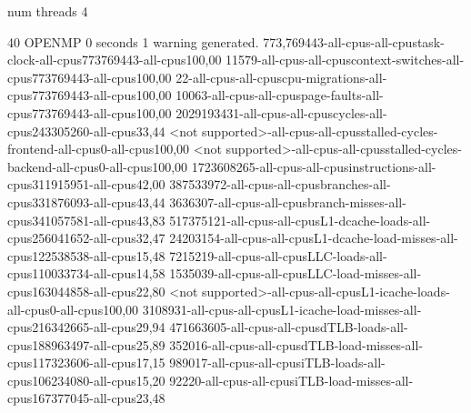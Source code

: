 num threads 4

40
OPENMP
0 seconds
1 warning generated.
773,769443-all-cpus-all-cpustask-clock-all-cpus773769443-all-cpus100,00
11579-all-cpus-all-cpuscontext-switches-all-cpus773769443-all-cpus100,00
22-all-cpus-all-cpuscpu-migrations-all-cpus773769443-all-cpus100,00
10063-all-cpus-all-cpuspage-faults-all-cpus773769443-all-cpus100,00
2029193431-all-cpus-all-cpuscycles-all-cpus243305260-all-cpus33,44
<not supported>-all-cpus-all-cpusstalled-cycles-frontend-all-cpus0-all-cpus100,00
<not supported>-all-cpus-all-cpusstalled-cycles-backend-all-cpus0-all-cpus100,00
1723608265-all-cpus-all-cpusinstructions-all-cpus311915951-all-cpus42,00
387533972-all-cpus-all-cpusbranches-all-cpus331876093-all-cpus43,44
3636307-all-cpus-all-cpusbranch-misses-all-cpus341057581-all-cpus43,83
517375121-all-cpus-all-cpusL1-dcache-loads-all-cpus256041652-all-cpus32,47
24203154-all-cpus-all-cpusL1-dcache-load-misses-all-cpus122538538-all-cpus15,48
7215219-all-cpus-all-cpusLLC-loads-all-cpus110033734-all-cpus14,58
1535039-all-cpus-all-cpusLLC-load-misses-all-cpus163044858-all-cpus22,80
<not supported>-all-cpus-all-cpusL1-icache-loads-all-cpus0-all-cpus100,00
3108931-all-cpus-all-cpusL1-icache-load-misses-all-cpus216342665-all-cpus29,94
471663605-all-cpus-all-cpusdTLB-loads-all-cpus188963497-all-cpus25,89
352016-all-cpus-all-cpusdTLB-load-misses-all-cpus117323606-all-cpus17,15
989017-all-cpus-all-cpusiTLB-loads-all-cpus106234080-all-cpus15,20
92220-all-cpus-all-cpusiTLB-load-misses-all-cpus167377045-all-cpus23,48
